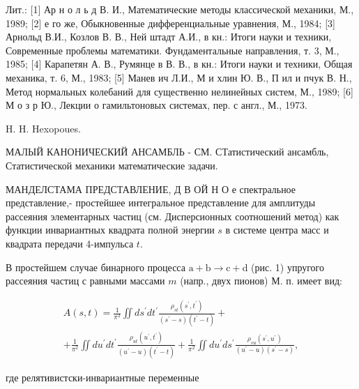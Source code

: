 \documentclass[10pt]{article}
\begin{document}
Лит.: [1] Ар н о л ь д В. И., Математические методы классической механики, М., 1989; [2] е го же, Обыкновенные дифференциальные уравнения, М., 1984; [3] Арнольд В.И., Козлов В. В., Ней штадт А.И., в кн.: Итоги науки и техники, Современные проблемы математики. Фундаментальные направления, т. 3, М., 1985; [4] Карапетян А. В., Румянце в В. В., в кн.: Итоги науки и техники, Общая механика, т. 6, М., 1983; [5] Манев ич Л.И., М и хлин Ю. В., П ил и пчук В. Н., Метод нормальных колебаний для существенно нелинейных систем, М., 1989; [6] М о з р Ю., Лекции о гамильтоновых системах, пер. с англ., М., 1973.



H. H. Hexopoues.



МАЛЫЙ КАНОНИЧЕСКИЙ АНСАМБЛЬ - СМ. СТатистический ансамбль, Статистической механики математические задачи.



МАНДЕЛСТАМА ПРЕДСТАВЛЕНИЕ, Д В ОЙ Н О е спектральное представление,- простейшее интегральное представление для амплитуды рассеяния элементарных частиц (см. Дисперсионных соотношений метод) как функции инвариантных квадрата полной энергии $s$ в системе центра масс и квадрата передачи 4-импульса $t$.



В простейшем случае бинарного процесса $\mathrm{a}+\mathrm{b} \rightarrow \mathrm{c}+\mathrm{d}$ (рис. 1) упругого рассеяния частиц с равными массами $m$ (напр., двух пионов) М. п. имеет вид:



\[

\begin{gathered}

A(s, t)=\frac{1}{\pi^{2}} \iint d s^{\prime} d t^{\prime} \frac{\rho_{s t}\left(s^{\prime}, t^{\prime}\right)}{\left(s^{\prime}-s\right)\left(t^{\prime}-t\right)}+ \\

+\frac{1}{\pi^{2}} \iint d u^{\prime} d t^{\prime} \frac{\rho_{u t}\left(u^{\prime}, t^{\prime}\right)}{\left(u^{\prime}-u\right)\left(t^{\prime}-t\right)}+\frac{1}{\pi^{2}} \iint d u^{\prime} d s^{\prime} \frac{\rho_{s u}\left(s^{\prime}, u^{\prime}\right)}{\left(u^{\prime}-u\right)\left(s^{\prime}-s\right)},

\end{gathered}

\]



где релятивистски-инвариантные переменные
\end{document}
